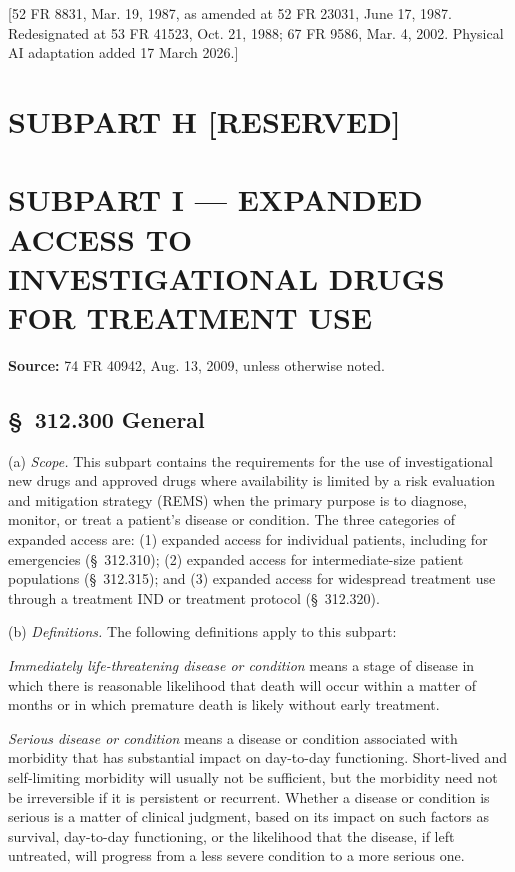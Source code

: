[52 FR 8831, Mar. 19, 1987, as amended at 52 FR 23031, June 17, 1987. Redesignated at 53 FR 41523, Oct. 21, 1988; 67 FR 9586, Mar. 4, 2002. Physical AI adaptation added 17 March 2026.]

\clearpage

\section{SUBPART H [RESERVED]}

\clearpage

\section{SUBPART I --- EXPANDED ACCESS TO INVESTIGATIONAL DRUGS FOR TREATMENT USE}

\textbf{Source:} 74 FR 40942, Aug. 13, 2009, unless otherwise noted.

\subsection{\S~312.300 General}

(a) \textit{Scope.} This subpart contains the requirements for the use of investigational new drugs and approved drugs where availability is limited by a risk evaluation and mitigation strategy (REMS) when the primary purpose is to diagnose, monitor, or treat a patient's disease or condition. The three categories of expanded access are: (1) expanded access for individual patients, including for emergencies (\S~312.310); (2) expanded access for intermediate-size patient populations (\S~312.315); and (3) expanded access for widespread treatment use through a treatment IND or treatment protocol (\S~312.320).

(b) \textit{Definitions.} The following definitions apply to this subpart:

\begin{description}[leftmargin=0.5cm,style=sameline]
\item[(1)] \textit{Immediately life-threatening disease or condition} means a stage of disease in which there is reasonable likelihood that death will occur within a matter of months or in which premature death is likely without early treatment.
\item[(2)] \textit{Serious disease or condition} means a disease or condition associated with morbidity that has substantial impact on day-to-day functioning. Short-lived and self-limiting morbidity will usually not be sufficient, but the morbidity need not be irreversible if it is persistent or recurrent. Whether a disease or condition is serious is a matter of clinical judgment, based on its impact on such factors as survival, day-to-day functioning, or the likelihood that the disease, if left untreated, will progress from a less severe condition to a more serious one.
\end{description}

